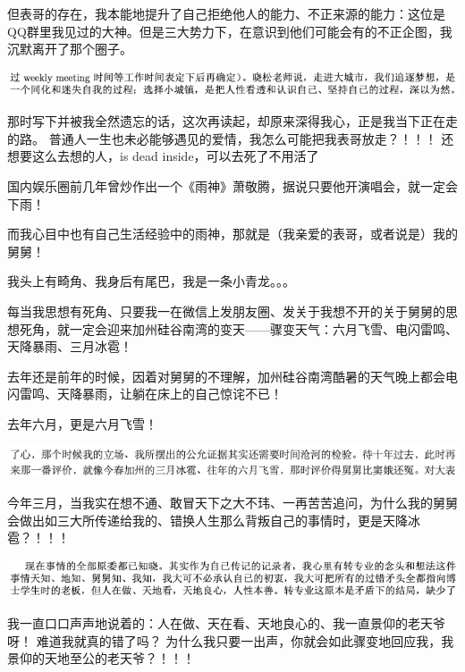 \documentclass[9pt, b5paper]{article}
\begin{document}
但表哥的存在，我本能地提升了自己拒绝他人的能力、不正来源的能力：这位是QQ群里我见过的大神。但是三大势力下，在意识到他们可能会有的不正企图，我沉默离开了那个圈子。 

\begin{center}
\includegraphics[width=.9\linewidth]{./pic/backups_plans_20210422_091518.png}
\end{center}

  那时写下并被我全然遗忘的话，这次再读起，却原来深得我心，正是我当下正在走的路。 
普通人一生也未必能够遇见的爱情，我怎么可能把我表哥放走？！！！
还想要这么去想的人，is dead inside，可以去死了不用活了

国内娱乐圈前几年曾炒作出一个《雨神》萧敬腾，据说只要他开演唱会，就一定会下雨！

而我心目中也有自己生活经验中的雨神，那就是（我亲爱的表哥，或者说是）我的舅舅！

我头上有畸角、我身后有尾巴，我是一条小青龙。。。

每当我思想有死角、只要我一在微信上发朋友圈、发关于我想不开的关于舅舅的思想死角，就一定会迎来加州硅谷南湾的变天——骤变天气：六月飞雪、电闪雷鸣、天降暴雨、三月冰雹！

去年还是前年的时候，因着对舅舅的不理解，加州硅谷南湾酷暑的天气晚上都会电闪雷鸣、天降暴雨，让躺在床上的自己惊诧不已！

去年六月，更是六月飞雪！

\begin{center}
\includegraphics[width=.9\linewidth]{./pic/backups_plans_20210423_230138.png}
\end{center}

今年三月，当我实在想不通、敢冒天下之大不玮、一再苦苦追问，为什么我的舅舅会做出如三大所传递给我的、错换人生那么背叛自己的事情时，更是天降冰雹？！！！

\begin{center}
\includegraphics[width=.9\linewidth]{./pic/backups_plans_20210422_090142.png}
\end{center}

我一直口口声声地说着的：人在做、天在看、天地良心的、我一直景仰的老天爷呀！
难道我就真的错了吗？
为什么我只要一出声，你就会如此骤变地回应我，我景仰的天地至公的老天爷？！！！
\end{document}
